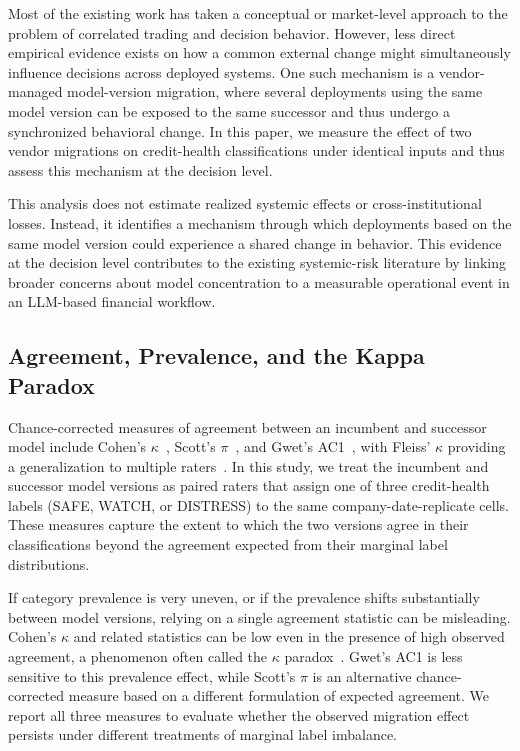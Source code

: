 \documentclass{ieeeaccess}
\begin{document}
Most of the existing work has taken a conceptual or market-level approach to the problem of correlated trading and decision behavior. However, less direct empirical evidence exists on how a common external change might simultaneously influence decisions across deployed systems. One such mechanism is a vendor-managed model-version migration, where several deployments using the same model version can be exposed to the same successor and thus undergo a synchronized behavioral change. In this paper, we measure the effect of two vendor migrations on credit-health classifications under identical inputs and thus assess this mechanism at the decision level.

This analysis does not estimate realized systemic effects or cross-institutional losses. Instead, it identifies a mechanism through which deployments based on the same model version could experience a shared change in behavior. This evidence at the decision level contributes to the existing systemic-risk literature by linking broader concerns about model concentration to a measurable operational event in an LLM-based financial workflow.

\subsection{Agreement, Prevalence, and the Kappa Paradox}
Chance-corrected measures of agreement between an incumbent and successor model include Cohen's $\kappa$~\cite{cohen}, Scott's $\pi$~\cite{scott}, and Gwet's AC1~\cite{gwet}, with Fleiss' $\kappa$ providing a generalization to multiple raters~\cite{fleiss}. In this study, we treat the incumbent and successor model versions as paired raters that assign one of three credit-health labels (SAFE, WATCH, or DISTRESS) to the same company-date-replicate cells. These measures capture the extent to which the two versions agree in their classifications beyond the agreement expected from their marginal label distributions.

If category prevalence is very uneven, or if the prevalence shifts substantially between model versions, relying on a single agreement statistic can be misleading. Cohen's $\kappa$ and related statistics can be low even in the presence of high observed agreement, a phenomenon often called the $\kappa$ paradox~\cite{feinstein}. Gwet's AC1 is less sensitive to this prevalence effect, while Scott's $\pi$ is an alternative chance-corrected measure based on a different formulation of expected agreement. We report all three measures to evaluate whether the observed migration effect persists under different treatments of marginal label imbalance.
\end{document}

